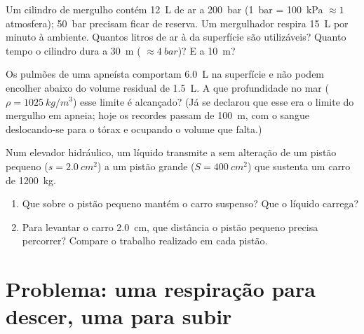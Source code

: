\begin{exercise}[$\star\star\star$]\label{exo:g10:pressure:13}
Um cilindro de mergulho contém \qty{12}{L} de ar a \qty{200}{bar}
(\qty{1}{bar} = \qty{100}{kPa} $\approx 1$ atmosfera); \qty{50}{bar}
precisam ficar de reserva. Um mergulhador respira \qty{15}{L} por minuto
à  ambiente. Quantos litros de ar à  da superfície são
utilizáveis? Quanto tempo o cilindro dura a \qty{30}{m} (
$\approx \qty{4}{bar}$)? E a \qty{10}{m}?
\end{exercise}

\begin{exercise}[$\star\star\star$]\label{exo:g10:pressure:14}
Os pulmões de uma apneísta comportam \qty{6.0}{L} na superfície e não
podem encolher abaixo do volume residual de \qty{1.5}{L}. A que
profundidade no mar ($\rho = \qty{1025}{kg/m^3}$) esse limite é
alcançado? (Já se declarou que esse era o limite do mergulho em apneia;
hoje os recordes passam de \qty{100}{m}, com o sangue deslocando-se para
o tórax e ocupando o volume que falta.)
\end{exercise}

\begin{exercise}[$\star\star\star$]\label{exo:g10:pressure:15}
Num elevador hidráulico, um líquido transmite a  sem alteração de
um pistão pequeno ($s = \qty{2.0}{cm^2}$) a um pistão grande
($S = \qty{400}{cm^2}$) que sustenta um carro de \qty{1200}{kg}.
\begin{enumerate}
  \item Que  sobre o pistão pequeno mantém o carro suspenso? Que
         o líquido carrega?
  \item Para levantar o carro \qty{2.0}{cm}, que distância o pistão
        pequeno precisa percorrer? Compare o trabalho realizado em cada
        pistão.
\end{enumerate}
\end{exercise}

\section{Problema: uma respiração para descer, uma para subir}

